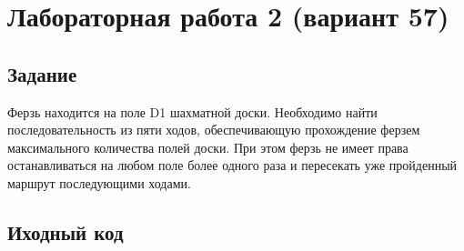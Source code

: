 \section{Лабораторная работа 2 (вариант 57)}
\subsection{Задание}

Ферзь находится на поле D1 шахматной доски. Необходимо найти последовательность из пяти ходов, обеспечивающую прохождение ферзем максимального количества полей доски. При этом ферзь не имеет права останавливаться на любом поле более одного раза и пересекать уже пройденный маршрут последующими ходами.

\subsection{Иходный код}
